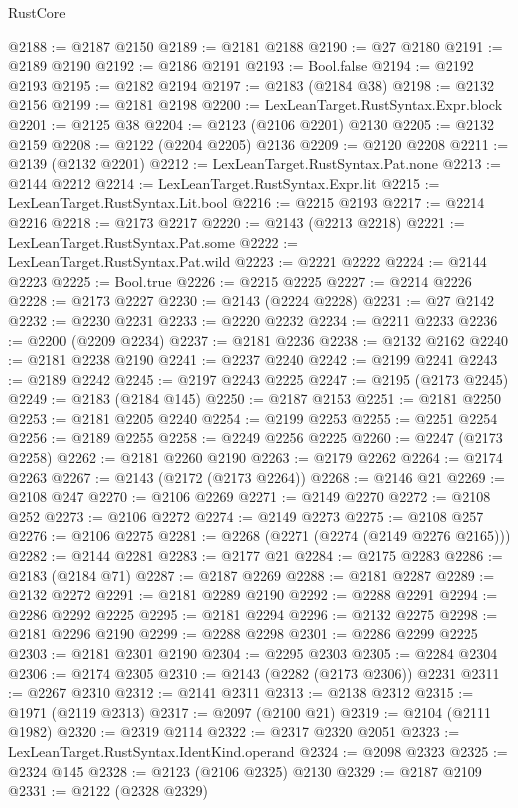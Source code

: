 \begin{lexlean}{RustCore}
\begin{coremodule}
@2188 := @2187 @2150
@2189 := @2181 @2188
@2190 := @27 @2180
@2191 := @2189 @2190
@2192 := @2186 @2191
@2193 := Bool.false
@2194 := @2192 @2193
@2195 := @2182 @2194
@2197 := @2183 (@2184 @38)
@2198 := @2132 @2156
@2199 := @2181 @2198
@2200 := LexLeanTarget.RustSyntax.Expr.block
@2201 := @2125 @38
@2204 := @2123 (@2106 @2201) @2130
@2205 := @2132 @2159
@2208 := @2122 (@2204 @2205) @2136
@2209 := @2120 @2208
@2211 := @2139 (@2132 @2201)
@2212 := LexLeanTarget.RustSyntax.Pat.none
@2213 := @2144 @2212
@2214 := LexLeanTarget.RustSyntax.Expr.lit
@2215 := LexLeanTarget.RustSyntax.Lit.bool
@2216 := @2215 @2193
@2217 := @2214 @2216
@2218 := @2173 @2217
@2220 := @2143 (@2213 @2218)
@2221 := LexLeanTarget.RustSyntax.Pat.some
@2222 := LexLeanTarget.RustSyntax.Pat.wild
@2223 := @2221 @2222
@2224 := @2144 @2223
@2225 := Bool.true
@2226 := @2215 @2225
@2227 := @2214 @2226
@2228 := @2173 @2227
@2230 := @2143 (@2224 @2228)
@2231 := @27 @2142
@2232 := @2230 @2231
@2233 := @2220 @2232
@2234 := @2211 @2233
@2236 := @2200 (@2209 @2234)
@2237 := @2181 @2236
@2238 := @2132 @2162
@2240 := @2181 @2238 @2190
@2241 := @2237 @2240
@2242 := @2199 @2241
@2243 := @2189 @2242
@2245 := @2197 @2243 @2225
@2247 := @2195 (@2173 @2245)
@2249 := @2183 (@2184 @145)
@2250 := @2187 @2153
@2251 := @2181 @2250
@2253 := @2181 @2205 @2240
@2254 := @2199 @2253
@2255 := @2251 @2254
@2256 := @2189 @2255
@2258 := @2249 @2256 @2225
@2260 := @2247 (@2173 @2258)
@2262 := @2181 @2260 @2190
@2263 := @2179 @2262
@2264 := @2174 @2263
@2267 := @2143 (@2172 (@2173 @2264))
@2268 := @2146 @21
@2269 := @2108 @247
@2270 := @2106 @2269
@2271 := @2149 @2270
@2272 := @2108 @252
@2273 := @2106 @2272
@2274 := @2149 @2273
@2275 := @2108 @257
@2276 := @2106 @2275
@2281 := @2268 (@2271 (@2274 (@2149 @2276 @2165)))
@2282 := @2144 @2281
@2283 := @2177 @21
@2284 := @2175 @2283
@2286 := @2183 (@2184 @71)
@2287 := @2187 @2269
@2288 := @2181 @2287
@2289 := @2132 @2272
@2291 := @2181 @2289 @2190
@2292 := @2288 @2291
@2294 := @2286 @2292 @2225
@2295 := @2181 @2294
@2296 := @2132 @2275
@2298 := @2181 @2296 @2190
@2299 := @2288 @2298
@2301 := @2286 @2299 @2225
@2303 := @2181 @2301 @2190
@2304 := @2295 @2303
@2305 := @2284 @2304
@2306 := @2174 @2305
@2310 := @2143 (@2282 (@2173 @2306)) @2231
@2311 := @2267 @2310
@2312 := @2141 @2311
@2313 := @2138 @2312
@2315 := @1971 (@2119 @2313)
@2317 := @2097 (@2100 @21)
@2319 := @2104 (@2111 @1982)
@2320 := @2319 @2114
@2322 := @2317 @2320 @2051
@2323 := LexLeanTarget.RustSyntax.IdentKind.operand
@2324 := @2098 @2323
@2325 := @2324 @145
@2328 := @2123 (@2106 @2325) @2130
@2329 := @2187 @2109
@2331 := @2122 (@2328 @2329)

\end{coremodule}
\end{lexlean}
